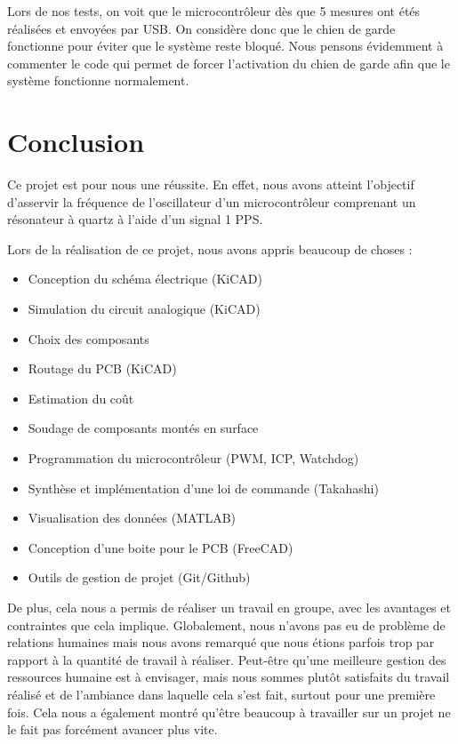 \documentclass[12pt, a4paper, titlepage]{article}
\begin{document}
Lors de nos tests, on voit que le microcontrôleur dès que 5 mesures ont étés réalisées et envoyées par USB. On considère donc que le chien de garde fonctionne pour éviter que le système reste bloqué. Nous pensons évidemment à commenter le code qui permet de forcer l'activation du chien de garde afin que le système fonctionne normalement.

\section{Conclusion}

Ce projet est pour nous une réussite. En effet, nous avons atteint l'objectif d'asservir la fréquence de l'oscillateur d'un microcontrôleur comprenant un résonateur à quartz à l'aide d'un signal 1 PPS.

Lors de la réalisation de ce projet, nous avons appris beaucoup de choses : \nopagebreak
\begin{itemize}
	\item Conception du schéma électrique (KiCAD)
	\item Simulation du circuit analogique (KiCAD)
	\item Choix des composants
	\item Routage du PCB (KiCAD)
	\item Estimation du coût
	\item Soudage de composants montés en surface
	\item Programmation du microcontrôleur (PWM, ICP, Watchdog)
	\item Synthèse et implémentation d'une loi de commande (Takahashi)
	\item Visualisation des données (MATLAB)
	\item Conception d'une boite pour le PCB (FreeCAD)
	\item Outils de gestion de projet (Git/Github)
\end{itemize}

\bigskip

De plus, cela nous a permis de réaliser un travail en groupe, avec les avantages et contraintes que cela implique. Globalement, nous n'avons pas eu de problème de relations humaines mais nous avons remarqué que nous étions parfois trop par rapport à la quantité de travail à réaliser. Peut-être qu'une meilleure gestion des ressources humaine est à envisager, mais nous sommes plutôt satisfaits du travail réalisé et de l'ambiance dans laquelle cela s'est fait, surtout pour une première fois. Cela nous a également montré qu'être beaucoup à travailler sur un projet ne le fait pas forcément avancer plus vite.
\end{document}
